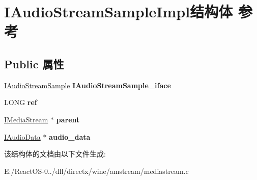 \hypertarget{struct_i_audio_stream_sample_impl}{}\section{I\+Audio\+Stream\+Sample\+Impl结构体 参考}
\label{struct_i_audio_stream_sample_impl}
\subsection*{Public 属性}
\begin{DoxyCompactItemize}
\item 
\mbox{\label{struct_i_audio_stream_sample_impl_a57a554b0f63330f623af4daf65863254}} 
\hyperlink{interface_i_audio_stream_sample}{I\+Audio\+Stream\+Sample} {\bfseries I\+Audio\+Stream\+Sample\+\_\+iface}
\item 
\mbox{\label{struct_i_audio_stream_sample_impl_afe94ec5454a767436abf2f8eb57bab04}} 
L\+O\+NG {\bfseries ref}
\item 
\mbox{\label{struct_i_audio_stream_sample_impl_a3f72e9e399ed4fbbf97ae2b5c8fc4515}} 
\hyperlink{interface_i_media_stream}{I\+Media\+Stream} $\ast$ {\bfseries parent}
\item 
\mbox{\label{struct_i_audio_stream_sample_impl_ac758cb32e99c7d855a6560e8975acbc5}} 
\hyperlink{interface_i_audio_data}{I\+Audio\+Data} $\ast$ {\bfseries audio\+\_\+data}
\end{DoxyCompactItemize}


该结构体的文档由以下文件生成\+:\begin{DoxyCompactItemize}
\item 
E\+:/\+React\+O\+S-\/0../dll/directx/wine/amstream/mediastream.\+c\end{DoxyCompactItemize}
